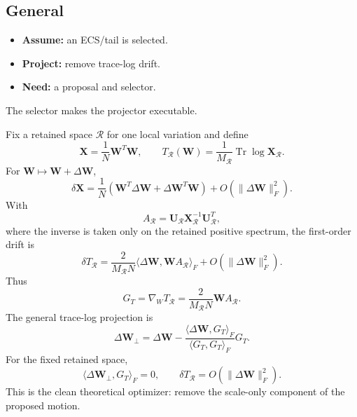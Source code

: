 \documentclass[10pt,twocolumn]{article}
\newcommand{\Tr}{\operatorname{Tr}}
\newcommand{\W}{\mathbf W}
\newcommand{\X}{\mathbf X}
\newcommand{\U}{\mathbf U}
\newcommand{\Rell}{\mathcal R}
\newcommand{\takeaway}[1]{%
  \par\vspace{4pt}\noindent\textcolor{boxblue}{#1}%
}
\begin{document}
\subsection{General}
\label{sxn:ideal_ecs_optimizer}

\begin{tcolorbox}[marginalbox,title=\textbf{13A. General}]
\begin{itemize}
\item \textbf{Assume:} an ECS/tail is selected.
\item \textbf{Project:} remove trace-log drift.
\item \textbf{Need:} a proposal and selector.
\end{itemize}
\takeaway{The selector makes the projector executable.}
\end{tcolorbox}

Fix a retained space \(\Rell\) for one local variation and define
\begin{equation}
        \X=\frac{1}{N}\W^T\W,
        \qquad
        T_{\Rell}(\W)=\frac{1}{M_{\Rell}}\Tr\log \X_{\Rell} .
\end{equation}
For \(\W\mapsto\W+\Delta\W\),
\begin{equation}
        \delta\X
        =
        \frac{1}{N}
        (\W^T\Delta\W+\Delta\W^T\W)
        +O(\|\Delta\W\|_F^2).
\end{equation}
With
\begin{equation}
        A_{\Rell}=\U_{\Rell}\X_{\Rell}^{-1}\U_{\Rell}^{T},
\end{equation}
where the inverse is taken only on the retained positive spectrum, the first-order drift is
\begin{equation}
        \delta T_{\Rell}
        =
        \frac{2}{M_{\Rell}N}
        \langle\Delta\W,\W A_{\Rell}\rangle_F
        +O(\|\Delta\W\|_F^2).
\end{equation}
Thus
\begin{equation}
        G_T=\nabla_WT_{\Rell}
        =
        \frac{2}{M_{\Rell}N}\W A_{\Rell} .
\end{equation}
The general trace-log projection is
\begin{equation}
        \boxed{
        \Delta\W_\perp
        =
        \Delta\W
        -
        \frac{\langle\Delta\W,G_T\rangle_F}
             {\langle G_T,G_T\rangle_F}G_T .}
\label{eq:ideal_trace_log_projector_summary}
\end{equation}
For the fixed retained space,
\begin{equation}
        \langle\Delta\W_\perp,G_T\rangle_F=0,
        \qquad
        \delta T_{\Rell}=O(\|\Delta\W\|_F^2).
\end{equation}
This is the clean theoretical optimizer: remove the scale-only component of the proposed motion.
\end{document}
